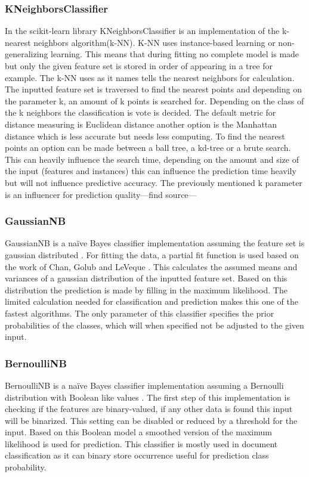 \documentclass[a4paper,10pt]{article}
\begin{document}
\subsubsection{KNeighborsClassifier}
In the scikit-learn library KNeighborsClassifier is an implementation of the k-nearest neighbors algorithm(k-NN). K-NN uses instance-based learning or non-generalizing learning. This means that during fitting no complete model is made but only the given feature set is stored in order of appearing in a tree for example. The k-NN uses as it names tells the nearest neighbors for calculation. The inputted feature set is traversed to find the nearest points and depending on the parameter k, an amount of k points is searched for. Depending on the class of the k neighbors the classification is vote is decided. The default metric for distance measuring is Euclidean distance another option is the Manhattan distance which is less accurate but needs less computing. To find the nearest points an option can be made between a ball tree, a kd-tree or a brute search. This can heavily influence the search time, depending on the amount and size of the input (features and instances) this can influence the prediction time heavily but will not influence predictive accuracy. The previously mentioned k parameter is an influencer for prediction quality—find source---


\subsubsection{GaussianNB}
GaussianNB is a naïve Bayes classifier implementation assuming the feature set is gaussian distributed \cite{Bayes}. For fitting the data, a partial fit function is used based on the work of Chan, Golub and LeVeque \cite{Sam-var}. This calculates the assumed means and variances of a gaussian distribution of the inputted feature set. Based on this distribution the prediction is made by filling in the maximum likelihood. The limited calculation needed for classification and prediction makes this one of the fastest algorithms. The only parameter of this classifier specifies the prior probabilities of the classes, which will when specified not be adjusted to the given input. 

\subsubsection{BernoulliNB}
BernoulliNB is a naïve Bayes classifier implementation assuming a Bernoulli distribution with Boolean like values \cite{NB-text}. The first step of this implementation is checking if the features are binary-valued, if any other data is found this input will be binarized. This setting can be disabled or reduced by a threshold for the input. Based on this Boolean model a smoothed version of the maximum likelihood is used for prediction. This classifier is mostly used in document classification as it can binary store occurrence useful for prediction class probability. 
\end{document}
